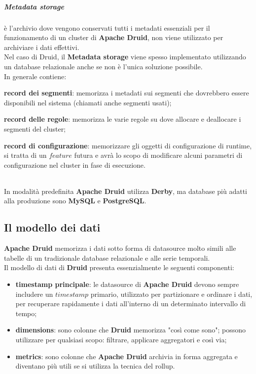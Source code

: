 \subparagraph{Metadata storage} è l’archivio dove vengono conservati tutti i \gls{metadati}{} essenziali
per il funzionamento di un \gls{cluster}{} di \textbf{Apache Druid}, non viene utilizzato per archiviare i dati effettivi.\\
Nel caso di Druid, il \textbf{Metadata storage} viene spesso implementato utilizzando un database relazionale anche se non è l'unica soluzione possibile.\\ 
In generale contiene:
\begin{list}{*}
    \item \textbf{record dei segmenti}: memorizza i \gls{metadati}{} sui segmenti che dovrebbero
    essere disponibili nel sistema (chiamati anche segmenti usati);
    \item \item \textbf{record delle regole}: memorizza le varie regole su dove allocare e deallocare i segmenti del cluster;
    \item \textbf{record di configurazione}: memorizzare gli oggetti di configurazione
    di runtime, si tratta di un $feature$ futura e avrà lo scopo di modificare alcuni parametri di configurazione nel \gls{cluster}{} in
    fase di esecuzione.
\end{list}
\noindent
\\
In modalità predefinita \textbf{Apache Druid} utilizza \textbf{Derby}, ma database più adatti alla produzione
sono \textbf{MySQL} e \textbf{PostgreSQL}.
\subsection{Il modello dei dati}
\textbf{Apache Druid} memorizza i dati sotto forma di \gls{datasource}{} molto simili alle tabelle di un tradizionale database relazionale e alle serie temporali.
\\Il modello di dati di \textbf{Druid} presenta essenzialmente le seguenti componenti:
\begin{itemize}
    \item \textbf{timestamp principale}:  le \gls{datasource}{} di \textbf{Apache Druid}  devono sempre includere un $timestamp$ primario,  utilizzato per partizionare e ordinare i dati, per recuperare rapidamente i dati all'interno di un determinato intervallo di tempo;
    \item \textbf{dimensions}: sono colonne che \textbf{Druid} memorizza "così come sono"; possono utilizzare per qualsiasi scopo: filtrare, applicare aggregatori e così via;
    \item \textbf{metrics}: sono colonne che \textbf{Apache Druid} archivia in forma aggregata e diventano più utili se si utilizza la tecnica del rollup.
\end{itemize}
\pagebreak
